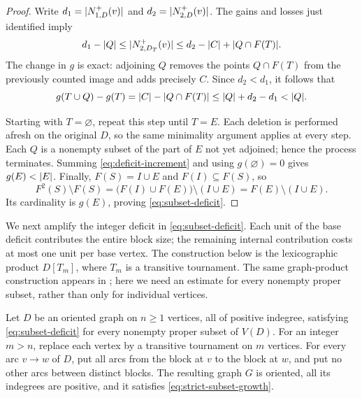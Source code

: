 \begin{proof}
Write $d_1=\lvert N_{1,D}^+(v)\rvert$ and
$d_2=\lvert N_{2,D}^+(v)\rvert$.  The gains and losses just identified imply
\[
  d_1-\lvert Q\rvert
  \le \lvert N_{2,D_T}^+(v)\rvert
  \le d_2-\lvert C\rvert+\lvert Q\cap F(T)\rvert.
\]
The change in $g$ is exact: adjoining $Q$ removes the points
$Q\cap F(T)$ from the previously counted image and adds precisely $C$.
Since $d_2<d_1$, it follows that
\begin{equation}
\label{eq:deficit-increment}
  g(T\cup Q)-g(T)
  =\lvert C\rvert-\lvert Q\cap F(T)\rvert
  \le \lvert Q\rvert+d_2-d_1
  <\lvert Q\rvert.
\end{equation}

Starting with $T=\varnothing$, repeat this step until $T=E$.
Each deletion is performed afresh on the original $D$, so the same
minimality argument applies at every step.  Each $Q$ is a nonempty
subset of the part of $E$ not yet adjoined; hence the process terminates.
Summing \eqref{eq:deficit-increment} and using $g(\varnothing)=0$
gives $g(E)<\lvert E\rvert$.  Finally,
$F(S)=I\cup E$ and $F(I)\subseteq F(S)$, so
\[
  F^2(S)\setminus F(S)
  =\bigl(F(I)\cup F(E)\bigr)\setminus(I\cup E)
  =F(E)\setminus(I\cup E).
\]
Its cardinality is $g(E)$, proving \eqref{eq:subset-deficit}.
\end{proof}

We next amplify the integer deficit in \eqref{eq:subset-deficit}.
Each unit of the base deficit contributes the entire block size; the
remaining internal contribution costs at most one unit per base vertex.
The construction below is the lexicographic product $D[T_m]$, where $T_m$
is a transitive tournament.  The same graph-product construction appears
in \cite[Theorem~4.3]{BrantnerBrockmanKaySnively2009}; here we need an
estimate for every nonempty proper subset, rather than only for individual
vertices.

\begin{lemma}
\label{lem:blowup}
Let $D$ be an oriented graph on $n\ge1$ vertices, all of positive
indegree, satisfying \eqref{eq:subset-deficit} for every nonempty proper
subset of $V(D)$.  For an integer $m>n$, replace each vertex by a
transitive tournament on $m$ vertices.  For every arc $v\to w$ of $D$,
put all arcs from the block at $v$ to the block at $w$, and put no other
arcs between distinct blocks.  The resulting graph $G$ is oriented,
all its indegrees are positive, and it satisfies
\eqref{eq:strict-subset-growth}.
\end{lemma}

